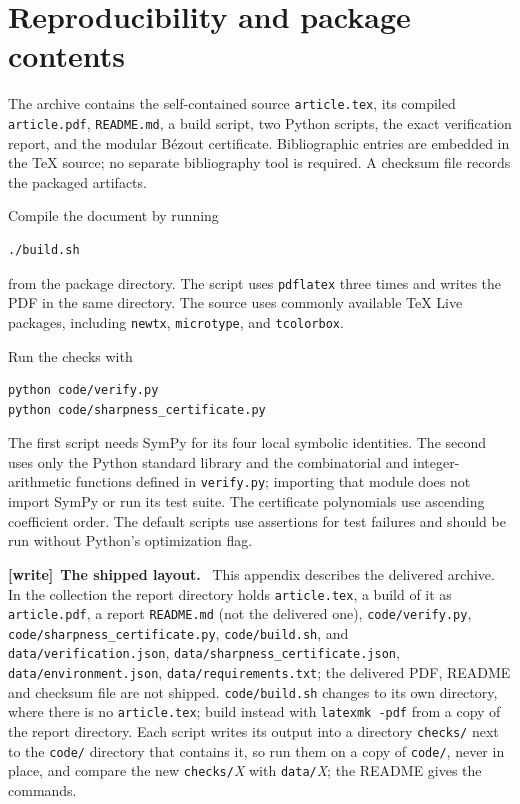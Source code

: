 \documentclass[11pt,letterpaper]{article}
\numberwithin{equation}{section}
\theoremstyle{definition}
\theoremstyle{remark}
\newcommand{\src}[1]{\texttt{\nolinkurl{#1}}}
\newenvironment{writenote}[1][]{\par\smallskip\begingroup\small
 \noindent\textbf{[write]}\if\relax\detokenize{#1}\relax\else~\textbf{#1.}\fi\ }%
 {\par\endgroup\smallskip}
\begin{document}
\appendix
\section{Reproducibility and package contents}
\label{sbr:app:package}

The archive contains the self-contained source \src{article.tex}, its
compiled \src{article.pdf}, \src{README.md}, a build script, two Python
scripts, the exact verification report, and the modular B\'ezout
certificate. Bibliographic entries are embedded in the TeX source; no
separate bibliography tool is required. A checksum file records the
packaged artifacts.

Compile the document by running
\begin{verbatim}
./build.sh
\end{verbatim}
from the package directory. The script uses \src{pdflatex} three times and
writes the PDF in the same directory. The source uses commonly available
TeX Live packages, including \src{newtx}, \src{microtype}, and
\src{tcolorbox}.

Run the checks with
\begin{verbatim}
python code/verify.py
python code/sharpness_certificate.py
\end{verbatim}
The first script needs SymPy for its four local symbolic identities. The
second uses only the Python standard library and the combinatorial and
integer-arithmetic functions defined in \src{verify.py}; importing that
module does not import SymPy or run its test suite. The certificate
polynomials use ascending coefficient order. The default scripts use
assertions for test failures and should be run without Python's
optimization flag.

\begin{writenote}[The shipped layout]
This appendix describes the delivered archive. In the collection the
report directory holds \src{article.tex}, a build of it as
\src{article.pdf}, a report \src{README.md} (not the delivered one),
\src{code/verify.py}, \src{code/sharpness_certificate.py},
\src{code/build.sh}, and \src{data/verification.json},
\src{data/sharpness_certificate.json}, \src{data/environment.json},
\src{data/requirements.txt}; the delivered PDF, README and checksum file are
not shipped. \src{code/build.sh} changes to its own directory, where there
is no \src{article.tex}; build instead with \src{latexmk -pdf} from a copy
of the report directory. Each script writes its output into a directory
\src{checks/} next to the \src{code/} directory that contains it, so run
them on a copy of \src{code/}, never in place, and compare the new
\src{checks/}\emph{X} with \src{data/}\emph{X}; the README gives the
commands.
\end{writenote}
\end{document}

